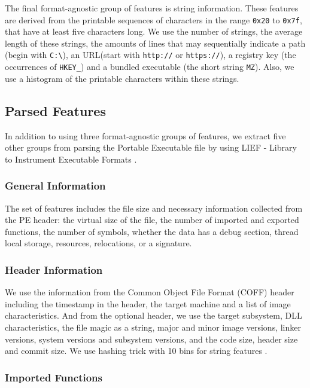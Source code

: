 The final format-agnostic group of features is string information. These features are derived from the printable sequences of characters in the range \verb|0x20| to \verb|0x7f|, that have at least five characters long. We use the number of strings, the average length of these strings, the amounts of lines  that may sequentially indicate a path (begin with \verb|C:\|), an URL(start with \verb|http://| or \verb|https://|), a registry key (the occurrences of \verb|HKEY_|) and a bundled executable (the short string \verb|MZ|). Also, we use a histogram of the printable characters within these strings.

\subsection{Parsed Features}

In addition to using three format-agnostic groups of features, we extract five other groups from parsing the Portable Executable file by using LIEF - Library to Instrument Executable Formats \cite{lief}.

\subsubsection{General Information}

The set of features includes the file size and necessary information collected from the PE header: the virtual size of the file, the number of imported and exported functions, the number of symbols, whether the data has a debug section, thread local storage, resources, relocations, or a signature.

\subsubsection{Header Information}

We use the information from the Common Object File Format (COFF) header including the timestamp in the header, the target machine and a list of image characteristics. And from the optional header, we use the target subsystem, DLL  characteristics,  the file magic as a string, major and minor image versions, linker versions, system versions and subsystem versions, and the code size, header size and commit size. We use hashing trick with 10 bins for string features \cite{weinberger2009feature}.

\subsubsection{Imported Functions}
\label{sssec:imported}


